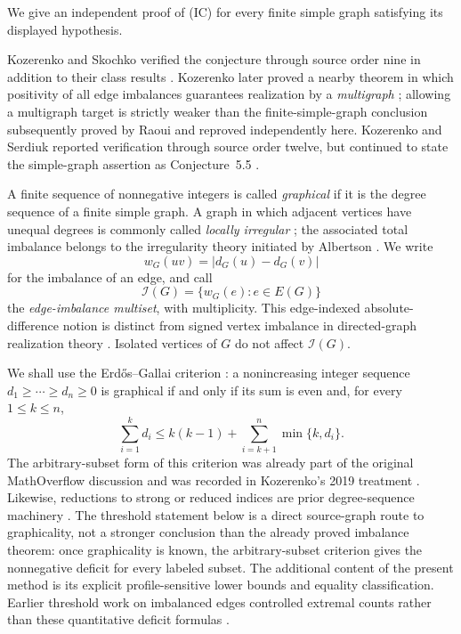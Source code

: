 \documentclass[a4paper,11pt]{amsart}
\numberwithin{equation}{section}
\theoremstyle{definition}
\theoremstyle{remark}
\newcommand{\Ical}{\mathcal I}
\begin{document}
We give an independent proof of \textup{(IC)} for every finite simple graph satisfying its displayed hypothesis.

Kozerenko and Skochko verified the conjecture through source order nine in addition to their class results \cite{KozerenkoSkochko2014}.  Kozerenko later proved a nearby theorem in which positivity of all edge imbalances guarantees realization by a \emph{multigraph} \cite[pp.~50--62]{Kozerenko2019}; allowing a multigraph target is strictly weaker than the finite-simple-graph conclusion subsequently proved by Raoui and reproved independently here.  Kozerenko and Serdiuk reported verification through source order twelve, but continued to state the simple-graph assertion as Conjecture~5.5 \cite{KozerenkoSerdiuk2023}.

A finite sequence of nonnegative integers is called \emph{graphical} if it is the degree sequence of a finite simple graph.  A graph in which adjacent vertices have unequal degrees is commonly called \emph{locally irregular} \cite{RautenbachVolkmann2002}; the associated total imbalance belongs to the irregularity theory initiated by Albertson \cite{Albertson1997}.  We write
\[
w_G(uv)=\lvert d_G(u)-d_G(v)\rvert
\]
for the imbalance of an edge, and call
\[
\Ical(G)=\bigl\{w_G(e):e\in E(G)\bigr\}
\]
the \emph{edge-imbalance multiset}, with multiplicity.  This edge-indexed absolute-difference notion is distinct from signed vertex imbalance in directed-graph realization theory \cite{MubayiWillWest2001}.  Isolated vertices of $G$ do not affect $\Ical(G)$.

We shall use the Erd\H{o}s--Gallai criterion \cite{ErdosGallai1960}: a nonincreasing integer sequence $d_1\ge\cdots\ge d_n\ge0$ is graphical if and only if its sum is even and, for every $1\le k\le n$,
\begin{equation}
\sum_{i=1}^k d_i
\le k(k-1)+\sum_{i=k+1}^n\min\{k,d_i\}.
\tag{EG}
\end{equation}
The arbitrary-subset form of this criterion was already part of the original MathOverflow discussion and was recorded in Kozerenko's 2019 treatment \cite{KozerenkoMO2013,Kozerenko2019}.  Likewise, reductions to strong or reduced indices are prior degree-sequence machinery \cite{ZverovichZverovich1992,TripathiVijay2003}.  The threshold statement below is a direct source-graph route to graphicality, not a stronger conclusion than the already proved imbalance theorem: once graphicality is known, the arbitrary-subset criterion gives the nonnegative deficit for every labeled subset.  The additional content of the present method is its explicit profile-sensitive lower bounds and equality classification.  Earlier threshold work on imbalanced edges controlled extremal counts rather than these quantitative deficit formulas \cite{RautenbachSchiermeyer2006}.
\end{document}
